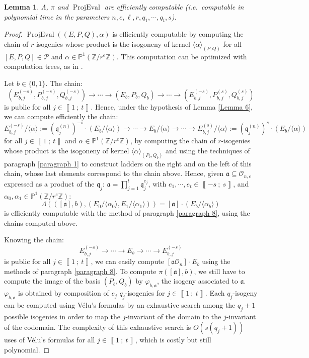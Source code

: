 \documentclass[a4paper,10pt]{report}
\theoremstyle{definition}
\theoremstyle{plain}
\newtheorem{Lemma}[Definition]{Lemma}
\theoremstyle{definition}
\newcommand{\ie}{\emph{i.e.}\ }
\newcommand{\Z}{\mathbb{Z}}
\newcommand{\m}[1]{\mathcal{#1}}
\newcommand{\mO}{\mathcal{O}}
\renewcommand{\i}[2]{\left\llbracket #1~;~#2\right\rrbracket}
\renewcommand{\(}{\left(}
\renewcommand{\)}{\right)}
\renewcommand{\P}{\mathbb{P}}
\newcommand{\mf}[1]{\mathfrak{#1}}
\DeclareMathOperator{\ProjEval}{ProjEval}
\begin{document}
\begin{Lemma}
$\Lambda$, $\pi$ and $\ProjEval$ are efficiently computable (\ie computable in polynomial time in the parameters $n, e,\ell, r, q_1, \cdots, q_t,s$).
\end{Lemma}

\begin{proof}
$\ProjEval((E,P,Q),\alpha)$ is efficiently computable by computing the chain of $r$-isogenies whose product is the isogoneny of kernel $\langle\alpha\rangle_{(P,Q)}$ for all $[E,P,Q]\in \m{P}$ and $\alpha\in\P^1(\Z/r^e\Z)$. This computation can be optimized with computation trees, as in \cite[section 4.2.2]{DeFeoSIDH}.

Let $b\in\{0,1\}$. The chain:
\[(E_{b,j}^{(-s)},P_{b,j}^{(-s)},Q_{b,j}^{(-s)})\longrightarrow \cdots \longrightarrow (E_{b},P_b,Q_b)\longrightarrow \cdots\longrightarrow (E_{b,j}^{(-s)},P_{b,j}^{(s)},Q_{b,j}^{(s)})\]
is public for all $j\in\i{1}{t}$. Hence, under the hypothesis of Lemma \ref{Lemma 6}, we can compute efficiently the chain:
\[E_{b,j}^{(-s)}/\langle\alpha\rangle:=(\mf{q}_j^{(n)})^{-s}\cdot (E_b/\langle\alpha\rangle)\longrightarrow \cdots \longrightarrow E_b/\langle\alpha\rangle\longrightarrow \cdots\longrightarrow E_{b,j}^{(s)}/\langle\alpha\rangle:=(\mf{q}_j^{(n)})^{s}\cdot(E_b/\langle\alpha\rangle)\]
for all $j\in\i{1}{t}$ and $\alpha\in\P^1(\Z/r^e\Z)$, by computing the chain of $r$-isogenies whose product is the isogoneny of kernel $\langle\alpha\rangle_{(P_b,Q_b)}$ and using the techniques of paragraph \ref{paragraph 1} to construct ladders on the right and on the left of this chain, whose last elements correspond to the chain above. Hence, given $\mf{a}\subseteq\mO_{n,e}$ expressed as a product of the $\mf{q}_j$: $\mf{a}=\prod_{j=1}^t\mf{q}_j^{e_j}$, with $e_1, \cdots, e_t\in\i{-s}{s}$, and $\alpha_0,\alpha_1\in\P^1(\Z/r^e\Z)$:
\[\Lambda(([\mf{a}],b),(E_0/\langle\alpha_0\rangle,E_1/\langle\alpha_1\rangle))=[\mf{a}]\cdot (E_b/\langle\alpha_b\rangle)\] 
is efficiently computable with the method of paragraph \ref{paragraph 8}, using the chains computed above. 

Knowing the chain:
\[E_{b,j}^{(-s)}\longrightarrow \cdots \longrightarrow E_{b}\longrightarrow \cdots\longrightarrow E_{b,j}^{(-s)}\]
is public for all $j\in\i{1}{t}$, we can easily compute $[\mf{a}\mO_n]\cdot E_b$ using the methods of paragraph \ref{paragraph 8}.  To compute $\pi([\mf{a}],b)$, we still have to compute the image of the basis $(P_b,Q_b)$ by $\varphi_{b,\mf{a}}$, the isogeny associated to $\mf{a}$.  $\varphi_{b,\mf{a}}$ is obtained by composition of $e_j$ $q_j$-isogenies for $j\in\i{1}{t}$.  Each $q_j$-isogeny can be computed using V\'{e}lu's formulas by an exhaustive search among the $q_j+1$ possible isogenies in order to map the $j$-invariant of the domain to the $j$-invariant of the codomain. The complexity of this exhaustive search is $O(s(q_j+1))$ uses of V\'{e}lu's formulas for all $j\in\i{1}{t}$, which is costly but still polynomial.
\end{proof}
\end{document}
